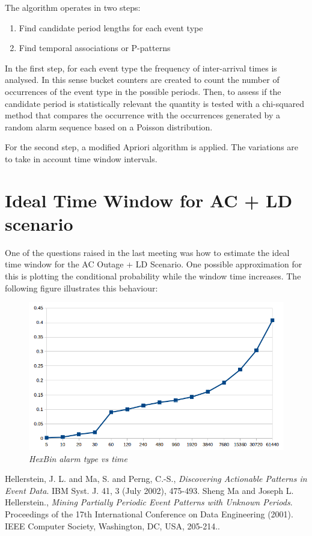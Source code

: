 \documentclass[10pt,a4paper]{article}
\begin{document}
The algorithm operates in two steps:

\begin{enumerate}
\item Find candidate period lengths for each event type
\item Find temporal associations or P-patterns
\end{enumerate}

In the first step, for each event type the frequency of inter-arrival times is analysed. In this sense bucket counters are created to count the number of occurrences of the event type in the possible periods. Then, to assess if the candidate period is statistically relevant the quantity is tested with a chi-squared method that compares the occurrence with the occurrences generated by a random alarm sequence based on a Poisson distribution.

For the second step, a modified Apriori algorithm is applied. The variations are to take in account time window intervals.

\section{Ideal Time Window for AC + LD scenario}
One of the questions raised in the last meeting was how to estimate  the ideal time window for the AC Outage + LD Scenario. One possible approximation for this is plotting the conditional probability while the window time increases. The following figure illustrates this behaviour:

\begin{figure}[H]
 \includegraphics[scale=0.5]{probConditionalScenario.png}
  \centering
  \caption{\textit{HexBin alarm type vs time }}
  \label{fig:ProbCond}
\end{figure}	


 \begin{thebibliography}{9}
 Hellerstein, J. L. and Ma, S. and Perng, C.-S., \emph{Discovering Actionable Patterns in Event Data}.
        IBM Syst. J. 41, 3 (July 2002), 475-493.
 Sheng Ma and Joseph L. Hellerstein., \emph{Mining Partially Periodic Event Patterns with Unknown Periods}. Proceedings of the 17th International Conference on Data Engineering (2001). IEEE Computer Society, Washington, DC, USA, 205-214..
\end{thebibliography}
 
\end{document}
